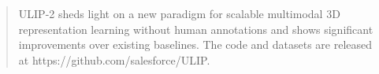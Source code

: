 \documentclass[10pt,twocolumn,letterpaper]{article}
\begin{document}
\begin{abstract}
ULIP-2 sheds light on a new paradigm for scalable multimodal 3D representation learning without human annotations and shows significant improvements over existing baselines.
The code and datasets are released at https://github.com/salesforce/ULIP.

\end{abstract}
\end{document}
